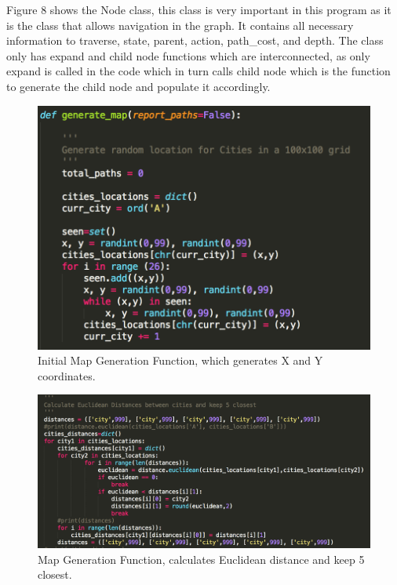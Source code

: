 \documentclass[12pt, letter]{article}
\begin{document}
Figure 8 shows the Node class, this class is very important in this program as it is the class that allows navigation in the graph. It contains all necessary information to traverse, state, parent, action, path\_cost, and depth. The class only has expand and child node functions which are interconnected, as only expand is called in the code which in turn calls child node which is the function to generate the child node and populate it accordingly. 

\FloatBarrier

\begin{figure}[htb]
  \centering
  \includegraphics[width=0.9 \textwidth]{./graphs/generate_map_1.png}
  \caption{Initial Map Generation Function, which generates X and Y coordinates.}
\end{figure}

\begin{figure}[htb]
  \centering
  \includegraphics[width=0.9 \textwidth]{./graphs/generate_map_2.png}
  \caption{Map Generation Function, calculates Euclidean distance and keep 5 closest.}
\end{figure}
\end{document}
